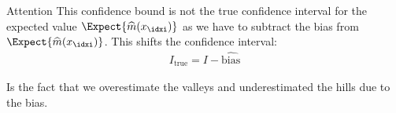\begin{attentionbox}{Attention}\nospacing
    This confidence bound is not the true confidence interval for the expected value $\Expect{\widehat{m}(x_{\idxi})}$
    as we have to subtract the bias from $\Expect{\widehat{m}(x_{\idxi})}$.
    This shifts the confidence interval:
    \begin{align}
      I_{\text{true}}=I-\widehat{\text{bias}}
    \end{align}
\end{attentionbox}
\begin{defnbox}\nospacing
    \begin{defn}[Erosion]\label{defn:errosion}
       Is the fact that we overestimate the valleys and underestimated the hills due to the bias.
    \end{defn}
\end{defnbox}

